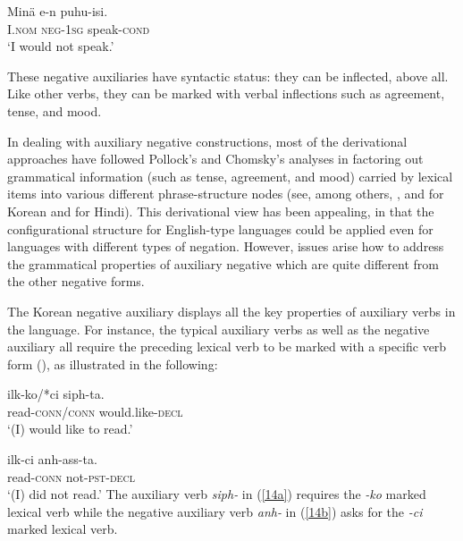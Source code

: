 \documentclass[output=paper
                ,modfonts
		,nonflat
	        ,collection
	        ,collectionchapter
	        ,collectiontoclongg
 	        ,biblatex  
                ,babelshorthands
                ,newtxmath
                ,draftmode
                ,colorlinks, citecolor=brown 
]{./langsci/langscibook}
\begin{document}
{\begin{exe}
\begin{xlist}
\begin{exe}
\begin{xlist}
\ea
\gll Min\"{a} e-n puhu-isi. \\
     I.\textsc{nom} \textsc{neg}-\textsc{1sg} speak-\textsc{cond} \\
\glt `I would not speak.'
\z

\noindent
These negative auxiliaries have syntactic status: they can be
inflected, above all. Like other verbs, they can be marked
with verbal inflections such as agreement, tense, and mood.

In dealing with auxiliary negative constructions,
most of the derivational approaches have
followed Pollock's and Chomsky's analyses in factoring out grammatical
information (such as tense, agreement, and mood) carried by lexical items into various different phrase-structure nodes (see, among others, \citep{Hagstrom:97,Hagstrom:02}, and \citep{Han:07} for Korean and \citep{Vasishth:00} for Hindi).
This derivational view has
been appealing, in that the configurational structure for English-type
languages could be applied even for languages with different types
of negation. However, issues arise how to address the grammatical
properties of auxiliary negative which are quite different from the
other negative forms.
%
%
%
%

%


%
The Korean negative auxiliary displays all the key properties of auxiliary verbs in the language. For instance, the typical auxiliary verbs as
well as the negative auxiliary all require the preceding lexical verb to be marked with a specific verb form (\vform), as illustrated
in the following:

\eal
\ex\label{14a}
\gll ilk-ko/*ci siph-ta. \\
     read-\textsc{conn}/\textsc{conn} would.like-\textsc{decl} \\
\glt `(I) would like to read.'

\ex\label{14b}
\gll ilk-ci anh-ass-ta. \\
     read-\textsc{conn} not-\textsc{pst}-\textsc{decl} \\
\glt `(I) did not read.'
\zl
\noindent
The auxiliary verb \textit{siph-} in (\ref{14a}) requires the
\textit{-ko} marked lexical verb while the negative auxiliary
 verb \textit{anh-} in (\ref{14b}) asks for the \textit{-ci} marked lexical verb.


\end{xlist}
\end{exe}
\end{xlist}
\end{exe}}
\end{document}
